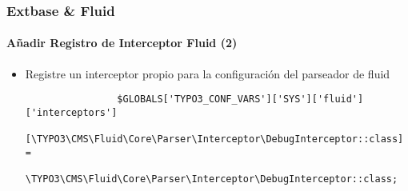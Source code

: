 \begin{frame}[fragile]
	\frametitle{Extbase \& Fluid}
	\framesubtitle{Añadir Registro de Interceptor Fluid (2)}

	\lstset{basicstyle=\tiny\ttfamily}

	\begin{itemize}

		\item Registre un interceptor propio para la configuración del parseador de fluid

			\begin{lstlisting}
				$GLOBALS['TYPO3_CONF_VARS']['SYS']['fluid']['interceptors']
			      [\TYPO3\CMS\Fluid\Core\Parser\Interceptor\DebugInterceptor::class] =
				  \TYPO3\CMS\Fluid\Core\Parser\Interceptor\DebugInterceptor::class;
			\end{lstlisting}

	\end{itemize}

\end{frame}

